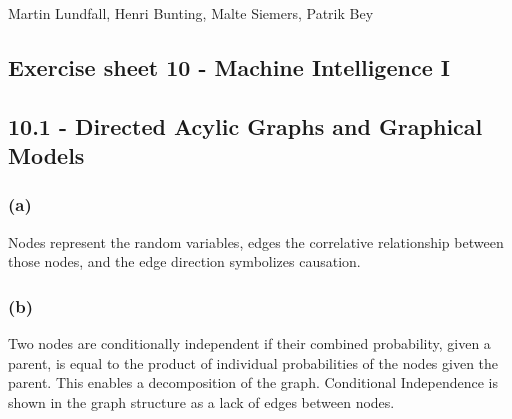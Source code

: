 \documentclass[11pt,a4paper]{article}
\begin{document}
\noindent
Martin Lundfall, Henri Bunting, Malte Siemers, Patrik Bey
\begin{centering}
  \section*{Exercise sheet 10 - Machine Intelligence I}
  \end{centering}
  
  \subsection*{10.1 - Directed Acylic Graphs and Graphical Models}
  
  \subsubsection*{(a)} Nodes represent the random variables, edges the correlative relationship between those nodes, and the edge direction symbolizes causation.
  \subsubsection*{(b)} Two nodes are conditionally independent if their combined probability, given a parent, is equal to the product of individual probabilities of the nodes given the parent.  This enables a decomposition of the graph.  Conditional Independence is shown in the graph structure as a lack of edges between nodes. 
  \newpage
\end{document}
